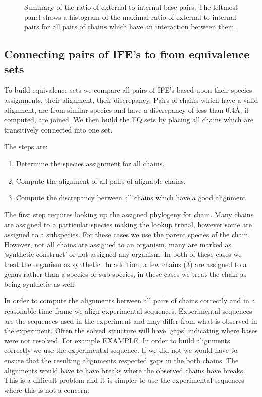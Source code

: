 \begin{figure}
  \caption{Summary of the ratio of external to internal base pairs. The leftmost
    panel shows a histogram of the maximal ratio of external to internal pairs
  for all pairs of chains which have an interaction between them. }
  \label{fig:ext-vs-int}
\end{figure}

\subsection{Connecting pairs of IFE's to from equivalence sets}

To build equivalence sets we compare all pairs of IFE’s based upon their species
assignments, their alignment, their discrepancy. Pairs of chains which have a
valid alignment, are from similar species and have a discrepancy of less than
0.4Å, if computed, are joined. We then build the EQ sets by placing all chains
which are transitively connected into one set. 

The steps are:
\begin{enumerate}
  \item Determine the species assignment for all chains.
  \item Compute the alignment of all pairs of alignable chains.
  \item Compute the discrepancy between all chains which have a good alignment
\end{enumerate}

The first step requires looking up the assigned phylogeny for chain. Many chains
are assigned to a particular species making the lookup trivial, however some are
assigned to a subspecies. For these cases we use the parent species of the
chain. However, not all chains are assigned to an organism, many are marked as
‘synthetic construct’ or not assigned any organism. In both of these cases we
treat the organism as synthetic. In addition, a few chains (3) are assigned to a
genus rather than a species or sub-species, in these cases we treat the chain as
being synthetic as well. 

In order to compute the alignments between all pairs of chains correctly and in
a reasonable time frame we align experimental sequences. Experimental sequences
are the sequences used in the experiment and may differ from what is observed in
the experiment. Often the solved structure will have ‘gaps’ indicating where
bases were not resolved. For example EXAMPLE. In order to build alignments
correctly we use the experimental sequence. If we did not we would have to
ensure that the resulting alignments respected gaps in the both chains. The
alignments would  have to have breaks where the observed chains have breaks.
This is a difficult problem and it is simpler to use the experimental sequences
where this is not a concern. 

